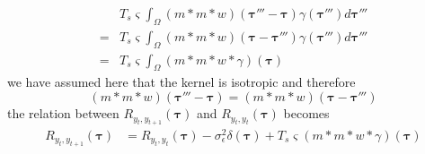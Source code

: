 \documentclass[]{article}
\begin{document}
\begin{align}
&T_s \varsigma\int_{\Omega} (m \ast m \ast w)\left(\boldsymbol \tau'''-\boldsymbol\tau\right)\gamma(\boldsymbol \tau''')d\boldsymbol \tau''' \nonumber \\
=&T_s \varsigma\int_{\Omega} (m \ast m \ast w)\left(\boldsymbol\tau-\boldsymbol \tau'''\right)\gamma(\boldsymbol \tau''')d\boldsymbol \tau''' \nonumber \\
=&T_s \varsigma\int_{\Omega} (m \ast m \ast w \ast \gamma)\left(\boldsymbol\tau\right)
\label{eq:ObsCrossCorr7}
\end{align}
we have assumed here that the kernel is isotropic and therefore
\begin{equation}
 (m \ast m \ast w)\left(\boldsymbol \tau'''-\boldsymbol\tau\right)=(m \ast m \ast w)\left(\boldsymbol\tau-\boldsymbol \tau'''\right)
\end{equation}
the relation between $R_{y_{t},y_{t+1}}(\boldsymbol{\tau})$ and $R_{y_{t},y_{t}}(\boldsymbol{\tau})$ becomes
\begin{align}
	R_{y_{t},y_{t+1}}(\boldsymbol{\tau}) &= R_{y_{t},y_{t}}(\boldsymbol{\tau})-\sigma_{\epsilon}^2\delta(\boldsymbol\tau)+T_s\varsigma\left(m\ast m\ast w\ast\gamma\right)\left(\boldsymbol\tau\right)
\end{align}



\end{document}
